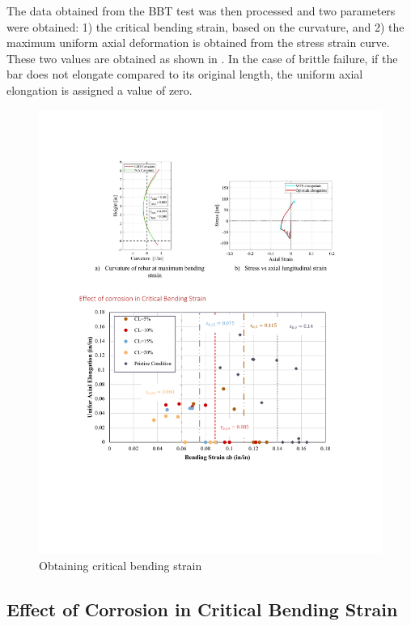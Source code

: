 The data obtained from the BBT test was then processed and two parameters were obtained: 1) the critical bending strain, based on the curvature, and 2) the maximum uniform axial deformation is obtained from the stress strain curve. These two values are obtained as shown in . In the case of brittle failure, if the bar does not elongate compared to its original length, the uniform axial elongation is assigned a value of zero.

\begin{figure}[htbp]
	\centering
	\includegraphics[width=1\textwidth]{VAC Thesis 2.0/Chapter-4/figs/BBT_curvature.pdf}
	\caption{Obtaining critical bending strain}
	\label{fig:bendingstrain}
\end{figure}

\subsection{Effect of Corrosion in Critical Bending Strain}

